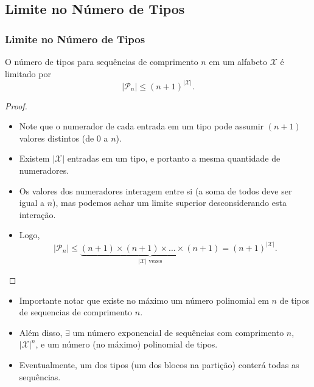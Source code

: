 \subsection{Limite no Número de Tipos}
\begin{frame}[allowframebreaks]
  \frametitle{Limite no Número de Tipos}
  \begin{theorem}
  O número de tipos para sequências de comprimento $n$ em um alfabeto $\mathcal{X}$ é limitado por
	\begin{equation}
	\label{eq:number-of-types-bound}
	\vert \mathcal{P}_n \vert \leq (n+1)^{\vert \mathcal{X} \vert} .
	\end{equation}
  \end{theorem}
  \begin{proof}
	\begin{itemize}
	\item Note que o numerador de cada entrada em um tipo pode assumir $(n+1)$ valores distintos (de $0$ a $n$).
	\item Existem $\vert \mathcal{X} \vert$ entradas em um tipo, e portanto a mesma quantidade de numeradores.
	\item Os valores dos numeradores interagem entre si (a soma de todos deve ser igual a $n$), mas podemos
		achar um limite superior desconsiderando esta interação. 
	\item Logo, 
	        \vspace{-2ex}
		\begin{equation}
		\vert \mathcal{P}_n \vert \leq \underbrace{(n+1)\times(n+1)\times\ldots\times(n+1)}_{\vert \mathcal{X} \vert \text{ vezes}} = (n+1)^{\vert \mathcal{X} \vert} .
		\end{equation}
	\end{itemize}
  \end{proof}

  \framebreak
  \begin{itemize}
  \item Importante notar que existe no máximo um número polinomial em $n$ de tipos de sequencias de comprimento $n$.
  \item Além disso, $\exists$ um número exponencial de sequências com comprimento $n$, $\vert \mathcal{X} \vert^n$, e 
	um número (no máximo) polinomial de tipos.
  \item Eventualmente, um dos tipos (um dos blocos na partição) conterá todas as sequências.
  \end{itemize}
\end{frame}



